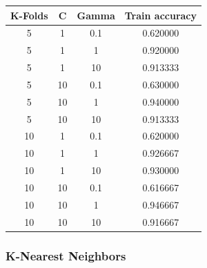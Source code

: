 \documentclass{article}
\begin{document}
\begin{table}[h]
\begin{tabular}{|c|c|c|c|}
\hline
\textbf{K-Folds} & \textbf{C} & \textbf{Gamma} & \textbf{Train accuracy} \\ \hline
5                & 1          & 0.1            & 0.620000       \\ \hline
5                & 1          & 1              & 0.920000       \\ \hline
5                & 1          & 10             & 0.913333       \\ \hline
5                & 10         & 0.1            & 0.630000       \\ \hline
5                & 10         & 1              & 0.940000       \\ \hline
5                & 10         & 10             & 0.913333       \\ \hline
10               & 1          & 0.1            & 0.620000       \\ \hline
10               & 1          & 1              & 0.926667       \\ \hline
10               & 1          & 10             & 0.930000       \\ \hline
10               & 10         & 0.1            & 0.616667       \\ \hline
\rowcolor[HTML]{34FF34}
10               & 10         & 1              & 0.946667       \\ \hline
10               & 10         & 10             & 0.916667       \\ \hline
\end{tabular}
\end{table}


\subsubsection{K-Nearest Neighbors}
\end{document}
